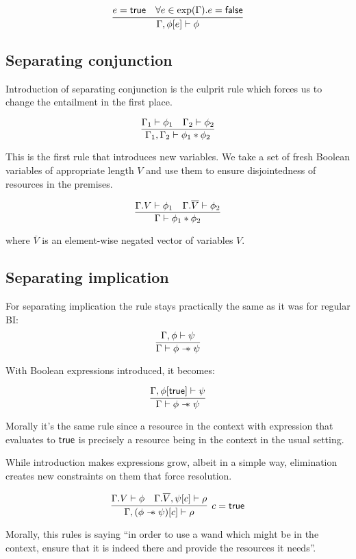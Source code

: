 \[\infer{\Gamma, \phi[e] \vdash \phi}
      {e = \true &
       \forall e \in \expr(\Gamma). e = \false}\]


\subsection{Separating conjunction}

Introduction of separating conjunction is the culprit rule which forces us to change the entailment in the first place.

\[\infer{\Gamma_1, \Gamma_2 \vdash \phi_1 \ast \phi_2}
        {\Gamma_1 \vdash \phi_1 &
         \Gamma_2 \vdash \phi_2}\]

This is the first rule that introduces new variables.
We take a set of fresh Boolean variables of appropriate length \(V\) and use them to ensure disjointedness of resources in the premises.

\[\infer{\Gamma \vdash \phi_1 \ast \phi_2}
        {\Gamma. V \vdash \phi_1 &
         \Gamma. \overline{V} \vdash \phi_2}\]

where \(\overline{V}\) is an element-wise negated vector of variables \(V\).

\subsection{Separating implication}
\label{sec:separating-impl-bi-with-constr}


For separating implication the rule stays practically the same as it was for regular BI:
\[
\infer{\Gamma \vdash \phi \wand \psi}
      {\Gamma , \phi \vdash \psi}
\]

With Boolean expressions introduced, it becomes:

\[
\infer{\Gamma \vdash \phi \wand \psi}
      {\Gamma , \phi[\true] \vdash \psi}
\]

Morally it's the same rule since a resource in the context with expression that evaluates to \(\textsf{true}\) is precisely a resource being in the context in the usual setting.

While introduction makes expressions grow, albeit in a simple way, elimination creates new constraints on them that force resolution.

\[
\infer[ c = \true ]
      {\Gamma, (\phi \wand \psi)[c] \vdash \rho}
      {\Gamma. V \vdash \phi &
       \Gamma. \overline{V}, \psi[c] \vdash \rho}
\]

Morally, this rules is saying ``in order to use a wand which might be in the context, ensure that it is indeed there and provide the resources it needs''.

